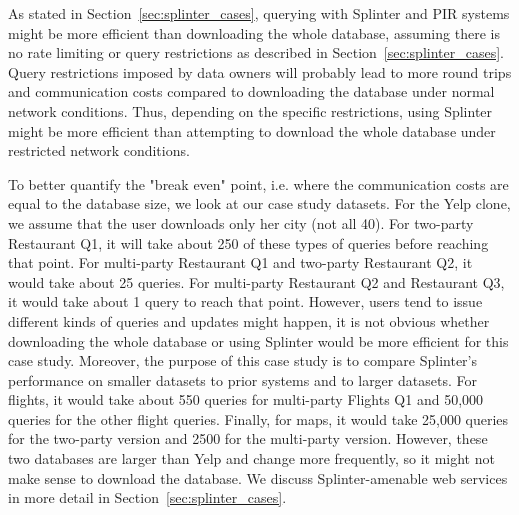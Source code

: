As stated in Section~\ref{sec:splinter_cases}, querying with 
Splinter and PIR systems might be more efficient than
downloading the whole database, assuming there is
no rate limiting or query restrictions as described in 
Section~\ref{sec:splinter_cases}. Query restrictions
imposed by data owners will probably lead to more round trips and
communication costs compared to downloading the database under normal
network conditions.  Thus, depending on the specific 
restrictions, using Splinter 
might be more efficient than attempting to download the whole database
under restricted network conditions.

To better quantify
the "break even" point, i.e. where the communication costs are equal
to the database size, we look at our case study datasets.
For the Yelp clone, we assume that the user downloads only her city (not all 40).
For two-party Restaurant Q1, it will take about 250 of these types of queries
before reaching that point.
For multi-party Restaurant Q1 and two-party Restaurant Q2, it would take about 25 queries.
For multi-party Restaurant Q2 and Restaurant Q3, 
it would take about 1 query to reach that point. However, users tend to issue
different kinds of queries and updates might happen, it is not obvious
whether downloading the whole database or using Splinter would be more efficient
for this case study. Moreover, the purpose of this case study is to compare
Splinter's performance on smaller datasets to prior systems and to larger datasets.
For flights, it would take about 550 queries for multi-party Flights Q1 and 
50,000 queries for the other flight queries. Finally, for maps,
it would take 25,000 queries for the two-party version and 2500 for the multi-party
version. However, these two databases are larger
than Yelp and change more frequently, so it might not make sense
to download the database. We discuss Splinter-amenable web services
in more detail in Section~\ref{sec:splinter_cases}.

